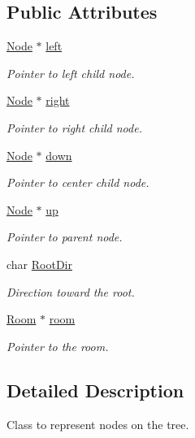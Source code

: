 \subsection*{Public Attributes}
\begin{DoxyCompactItemize}
\item 
\hyperlink{classRoomTree_1_1Node}{Node} $\ast$ \hyperlink{classRoomTree_1_1Node_a23c54a5e069e1339e1534f0a0632fc08}{left}
\begin{DoxyCompactList}\small\item\em Pointer to left child node. \end{DoxyCompactList}\item 
\hyperlink{classRoomTree_1_1Node}{Node} $\ast$ \hyperlink{classRoomTree_1_1Node_af770714f2bca461a776bb53feb82650c}{right}
\begin{DoxyCompactList}\small\item\em Pointer to right child node. \end{DoxyCompactList}\item 
\hyperlink{classRoomTree_1_1Node}{Node} $\ast$ \hyperlink{classRoomTree_1_1Node_a27ff1df50b7ec9d70240ddee99556432}{down}
\begin{DoxyCompactList}\small\item\em Pointer to center child node. \end{DoxyCompactList}\item 
\hyperlink{classRoomTree_1_1Node}{Node} $\ast$ \hyperlink{classRoomTree_1_1Node_a24e82297cf3fe584fbca68f790c51abf}{up}
\begin{DoxyCompactList}\small\item\em Pointer to parent node. \end{DoxyCompactList}\item 
char \hyperlink{classRoomTree_1_1Node_a3e006530059cc6994534d92e10b5fc72}{Root\-Dir}
\begin{DoxyCompactList}\small\item\em Direction toward the root. \end{DoxyCompactList}\item 
\hyperlink{classRoom}{Room} $\ast$ \hyperlink{classRoomTree_1_1Node_a4f39bdd1110291bf2e6eb14469f9b1e3}{room}
\begin{DoxyCompactList}\small\item\em Pointer to the room. \end{DoxyCompactList}\end{DoxyCompactItemize}


\subsection{Detailed Description}
Class to represent nodes on the tree. 

